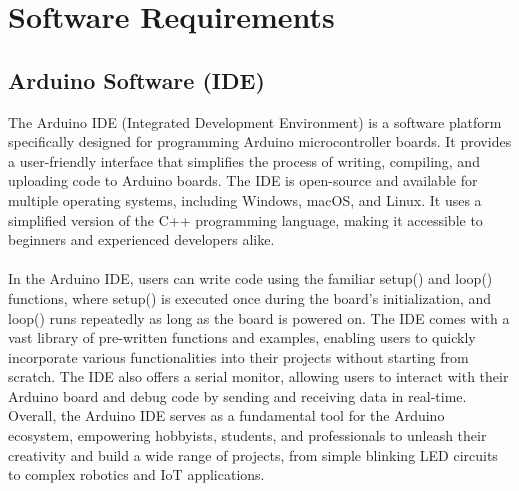 \documentclass[12pt,a4paper]{report}
\begin{document}
		
	\section{Software Requirements}
	
	\subsection{Arduino Software (IDE)}
	
	\begin{justify}
		The Arduino IDE (Integrated Development Environment) is a software platform specifically designed for programming Arduino microcontroller boards. It provides a user-friendly interface that simplifies the process of writing, compiling, and uploading code to Arduino boards. The IDE is open-source and available for multiple operating systems, including Windows, macOS, and Linux. It uses a simplified version of the C++ programming language, making it accessible to beginners and experienced developers alike. \\ 
		\\In the Arduino IDE, users can write code using the familiar setup() and loop() functions, where setup() is executed once during the board's initialization, and loop() runs repeatedly as long as the board is powered on. The IDE comes with a vast library of pre-written functions and examples, enabling users to quickly incorporate various functionalities into their projects without starting from scratch. The IDE also offers a serial monitor, allowing users to interact with their Arduino board and debug code by sending and receiving data in real-time. Overall, the Arduino IDE serves as a fundamental tool for the Arduino ecosystem, empowering hobbyists, students, and professionals to unleash their creativity and build a wide range of projects, from simple blinking LED circuits to complex robotics and IoT applications.
	\end{justify}	
			
	
	
	
	
	
	
	
	
	
	
\end{document}
